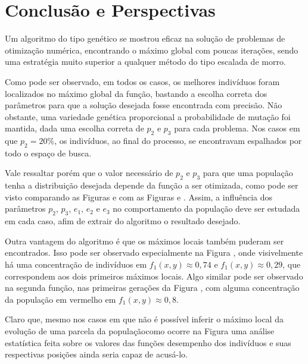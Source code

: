 \chapter{Conclusão e Perspectivas}\label{cap_conclusao}

Um algoritmo do tipo genético se mostrou eficaz na solução de problemas de otimização
numérica, encontrando o máximo global com poucas iterações, sendo uma
estratégia muito superior a qualquer método do tipo escalada de morro. 

Como pode ser observado, em todos os casos, os melhores indivíduos foram localizados no máximo global
da função, bastando a escolha correta dos parâmetros para que a solução desejada
fosse encontrada com precisão. Não obstante, uma variedade genética proporcional a
probabilidade de mutação foi mantida, dada uma escolha correta de $p_2$ e $p_3$ para cada
problema. Nos casos em que $p_2 = 20\%$, os indivíduos, ao final do processo, se encontravam
espalhados por todo o espaço de busca. 

Vale ressaltar porém que o valor necessário de $p_2$ e $p_3$ para que uma população 
tenha a distribuição desejada depende da função a ser otimizada, como pode ser visto
comparando as Figuras  e 
com as Figuras  e .
Assim, a influência dos parâmetros $p_2$, $p_3$, $e_1$, $e_2$ e $e_3$ no comportamento da população
deve ser estudada em cada caso, afim de extrair do algoritmo o resultado desejado.

Outra vantagem do algoritmo é que os máximos locais também puderam ser encontrados.
Isso pode ser observado especialmente na Figura ,
onde visivelmente há uma concentração de indivíduos em $ f_1(x,y) \approx 0,74 $ e 
$ f_1(x,y) \approx 0,29 $, que correspondem aos dois primeiros máximos locais.
Algo similar pode ser observado na segunda função, nas primeiras gerações da Figura 
, com alguma concentração da população em
vermelho em $f_1(x,y) \approx 0,8$.

Claro que, mesmo nos casos em que não é possível inferir o máximo local da evolução
de uma parcela da população\trav como ocorre na Figura \trav
uma análise estatística feita sobre os valores das funções desempenho dos indivíduos e
suas respectivas posições ainda seria capaz de acusá-lo.

